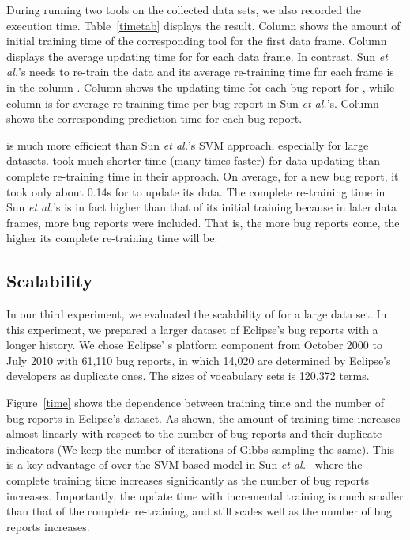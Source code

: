 During running two tools on the collected data sets, we also recorded
the execution time. Table~\ref{timetab} displays the result. Column
 shows the amount of initial training time of
the corresponding tool for the first data frame. Column  displays the average updating time for {\model} for each data
frame. In contrast, Sun {\em et al.}'s needs to re-train the data and
its average re-training time for each frame is in the column
. Column  shows the
updating time for each bug report for {\model}, while column
 is for average re-training time per bug
report in Sun {\em et al.}'s. Column 
shows the corresponding prediction time for each bug report.

{\model} is much more efficient than Sun {\em et al.}'s SVM approach,
especially for large datasets. {\model} took much shorter time (many
times faster) for data updating than complete re-training time in
their approach. On average, for a new bug report, it took only about
0.14s for {\model} to update its data.
The complete re-training time in Sun {\em et al.}'s is in fact higher
than that of its initial training because in later data frames, more bug
reports were included. That is, the more bug reports come, the higher
its complete re-training time will be.


\subsection{Scalability}

In our third experiment, we evaluated the scalability of {\model}
for a large data set. In this experiment, we prepared a larger dataset
of Eclipse's bug reports with a longer history. We chose Eclipse' s
platform component from October 2000 to July 2010 with 61,110 bug
reports, in which 14,020 are determined by Eclipse's developers as
duplicate ones.  The sizes of vocabulary sets is 120,372 terms. 

Figure~\ref{time} shows the dependence between training time and the
number of bug reports in Eclipse's dataset. As shown, the amount of
training time increases almost linearly with respect to the number of
bug reports and their duplicate indicators (We keep the number of
iterations of Gibbs sampling the same). This is a key advantage of
{\model} over the SVM-based model in Sun {\em et al.}~\cite{davidlo10}
where the complete training time increases significantly as the number
of bug reports increases. Importantly, the update time with
incremental training is much smaller than that of the complete
re-training, and {\model} still scales well as the number of bug
reports increases.

